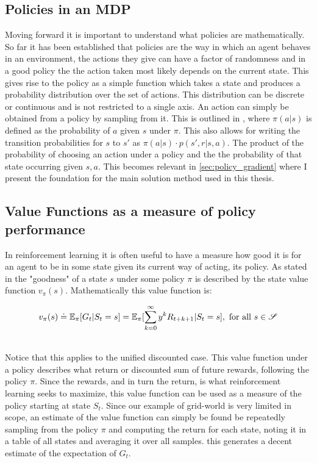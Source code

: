 \subsection{Policies in an MDP}
Moving forward it is important to understand what policies are mathematically. So far it has been established that policies are the way in which an agent behaves in an environment, the actions they give can have a factor of randomness and in a good policy the the action taken most likely depends on the current state. This gives rise to the policy as a simple function which takes a state and produces a probability distribution over the set of actions. This distribution can be discrete or continuous and is not restricted to a single axis. An action can simply be obtained from a policy by sampling from it. This is outlined in , where $\pi(a|s)$ is defined as the probability of $a$ given $s$ under $\pi$. This also allows for writing the transition probabilities for $s$ to $s'$ as $\pi(a|s) \cdot p(s', r|s, a)$. The product of the probability of choosing an action under a policy and the the probability of that state occurring given $s, a$. This becomes relevant in \ref{sec:policy_gradient} where I present the foundation for the main solution method used in this thesis.

\subsection{Value Functions as a measure of policy  performance}\label{sec:value_functions}
In reinforcement learning it is often useful to have a measure how good it is for an agent to be in some state given its current way of acting, its policy. As stated in  the "goodness" of a state $s$ under some policy $\pi$ is described by the state value function $v_\pi(s)$. Mathematically this value function is:

\begin{equation}\label{state_value_function}
    v_\pi(s) \doteq \mathbb{E}_\pi[G_t | S_t=s] = \mathbb{E}_\pi[\sum_{k=0}^{\infty} y^k R_{t+k+1}|S_t=s] , \mathrm{\ for\ all\ } s \in \mathset{S}
\end{equation}
\centerline{\small{}}

\noindent
\\ Notice that this applies to the unified discounted case. This value function under a policy describes what return or discounted sum of future rewards, following the policy $\pi$. Since the rewards, and in turn the return, is what reinforcement learning seeks to maximize, this value function can be used as a measure of the policy starting at state $S_t$. Since our example of grid-world is very limited in scope, an estimate of the value function can simply be found be repeatedly sampling from the policy $\pi$ and computing the return for each state, noting it in a table of all states and averaging it over all samples. this generates a decent estimate of the expectation of $G_t$.


